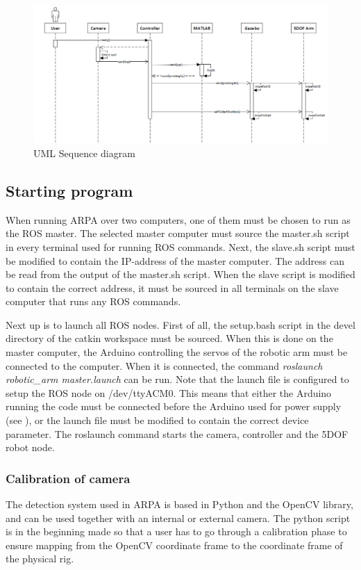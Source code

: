 \documentclass[11pt,a4paper, titlepage]{article}
\begin{document}
	
	\begin{figure}[H]
		\includegraphics[width=\linewidth]{../Diagrams/SequenceDiagram-v1.png}
		\caption{UML Sequence diagram}
		\label{fig:seq-diagram}
	\end{figure}
	
	\subsection{Starting program}
	\label{startup}
	
	When running ARPA over two computers, one of them must be chosen to run as the ROS master. The selected master computer must source the master.sh script in every terminal used for running ROS commands. Next, the slave.sh script must be modified to contain the IP-address of the master computer. The address can be read from the output of the master.sh script. When the slave script is modified to contain the correct address, it must be sourced in all terminals on the slave computer that runs any ROS commands.
	
	Next up is to launch all ROS nodes. First of all, the setup.bash script in the devel directory of the catkin workspace must be sourced. When this is done on the master computer, the Arduino controlling the servos of the robotic arm must be connected to the computer. When it is connected, the command \textit{roslaunch robotic\_arm master.launch} can be run. Note that the launch file is configured to setup the ROS node on /dev/ttyACM0. This means that either the Arduino running the code must be connected before the Arduino used for power supply (see ), or the launch file must be modified to contain the correct device parameter. The roslaunch command starts the camera, controller and the 5DOF robot node. 
	
\subsubsection{Calibration of camera}
The detection system used in ARPA is based in Python and the OpenCV library, and can be used together with an internal or external camera. The python script is in the beginning made so that a user has to go through a calibration phase to ensure mapping from the OpenCV coordinate frame to the coordinate frame of the physical rig.
\end{document}
